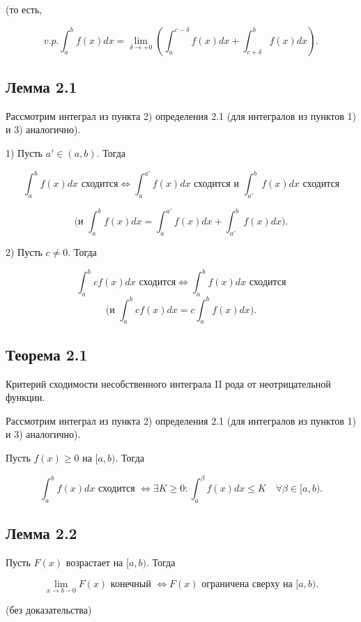 {(то есть, 



\[
v.p. \int_{a}^{b} f(x)dx = \lim_{\delta \to +0} \left( \int_{a}^{c-\delta} f(x)dx + \int_{c+\delta}^{b} f(x)dx \right).
\]

\subsection*{Лемма 2.1}

Рассмотрим интеграл из пункта 2) определения 2.1 (для интегралов из пунктов 1) и 3) аналогично).

1) Пусть \( a' \in (a, b) \). Тогда



\[
\int_{a}^{b} f(x) dx \text{ сходится} \Leftrightarrow \int_{a}^{a'} f(x) dx \text{ сходится} \text{ и } \int_{a'}^{b} f(x) dx \text{ сходится}
\]

\[
\text{(и }\int_{a}^{b} f(x) dx = \int_{a}^{a'} f(x) dx + \int_{a'}^{b} f(x) dx).
\]

2) Пусть \( c \neq 0 \). Тогда

\[
\int_{a}^{b} c f(x) dx \text{ сходится} \Leftrightarrow \int_{a}^{b} f(x) dx \text{ сходится}
\]
\[
\text{(и }\int_{a}^{b} c f(x) dx = c \int_{a}^{b} f(x) dx).
\]

\subsection*{Теорема 2.1}

Критерий сходимости несобственного интеграла II рода от неотрицательной функции.

Рассмотрим интеграл из пункта 2) определения 2.1 (для интегралов из пунктов 1) и 3) аналогично).

Пусть \( f(x) \geq 0 \) на \( [a, b) \). Тогда

\[
\int_{a}^{b} f(x) dx \text{ сходится } \Leftrightarrow \exists K \geq 0: \int_{a}^{\beta} f(x) dx \leq K \quad \forall \beta \in [a, b).
\]

\subsection*{Лемма 2.2}

Пусть \( F(x) \) возрастает на \( [a, b) \). Тогда

\[
\lim_{x \to b-0} F(x) \text{ конечный } \Leftrightarrow F(x) \text{ ограничена сверху на } [a, b).
\]

(без доказательства)

}
